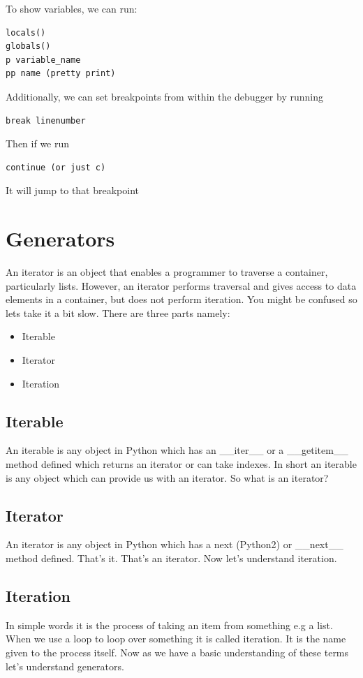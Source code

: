 \documentclass{report}
\begin{document}
    \bigbreak \noindent 
    To show variables, we can run:
\begin{verbatim}
locals()
globals()
p variable_name
pp name (pretty print)
\end{verbatim}
    Additionally, we can set breakpoints from within the debugger by running
    \begin{verbatim}
break linenumber
    \end{verbatim}
    Then if we run
\begin{verbatim}
continue (or just c)
\end{verbatim}
It will jump to that breakpoint


    \pagebreak \bigbreak \noindent
    \section{Generators}
    \bigbreak \noindent
    An iterator is an object that enables a programmer to traverse a container, particularly lists. However, an iterator performs traversal and gives access to data elements in a container, but does not perform iteration. You might be confused so lets take it a bit slow. There are three parts namely:
    \begin{itemize}
        \item Iterable
        \item Iterator
        \item Iteration
    \end{itemize}
    \subsection{Iterable}
    \bigbreak \noindent
    An iterable is any object in Python which has an \_\_iter\_\_ or a \_\_getitem\_\_ method defined which returns an iterator or can take indexes. In short an iterable is any object which can provide us with an iterator. So what is an iterator?

    \subsection{Iterator}
    \bigbreak \noindent
    An iterator is any object in Python which has a next (Python2) or \_\_next\_\_ method defined. That’s it. That’s an iterator. Now let’s understand iteration.
    \subsection{Iteration}
    \bigbreak \noindent
    In simple words it is the process of taking an item from something e.g a list. When we use a loop to loop over something it is called iteration. It is the name given to the process itself. Now as we have a basic understanding of these terms let’s understand generators.
\end{document}
